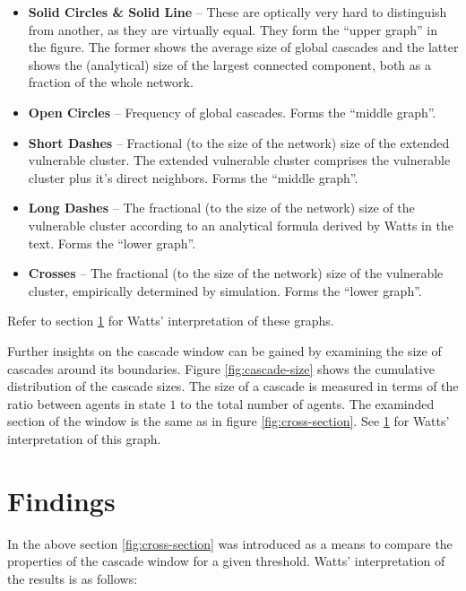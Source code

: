 \documentclass{sig-alternate-05-2015}
\begin{document}
\begin{itemize}
  \item \textbf{Solid Circles \& Solid Line} -- These are optically very hard to distinguish from another, as they are virtually equal. They form the ``upper graph'' in the figure. The former shows the average size of global cascades and the latter shows the (analytical) size of the largest connected component, both as a fraction of the whole network.
  \item \textbf{Open Circles} -- Frequency of global cascades. Forms the ``middle graph''.
  \item \textbf{Short Dashes} -- Fractional (to the size of the network) size of the extended vulnerable cluster. The extended vulnerable cluster comprises the vulnerable cluster plus it's direct neighbors. Forms the ``middle graph''.
  \item \textbf{Long Dashes} -- The fractional (to the size of the network) size of the vulnerable cluster according to an analytical formula derived by Watts in the text. Forms the ``lower graph''.
  \item \textbf{Crosses} -- The fractional (to the size of the network) size of the vulnerable cluster, empirically determined by simulation. Forms the ``lower graph''.
\end{itemize}

Refer to section \ref{sec:findings} for Watts' interpretation of these graphs.

Further insights on the cascade window can be gained by examining the size of cascades around its boundaries. Figure \ref{fig:cascade-size} shows the cumulative distribution of the cascade sizes. The size of a cascade is measured in terms of the ratio between agents in state $1$ to the total number of agents. The examinded section of the window is the same as in figure \ref{fig:cross-section}. See \ref{sec:findings} for Watts' interpretation of this graph.


\section{Findings}\label{sec:findings}

In the above section \ref{fig:cross-section} was introduced as a means to compare the properties of the cascade window for a given threshold. Watts' interpretation of the results is as follows:
\end{document}
